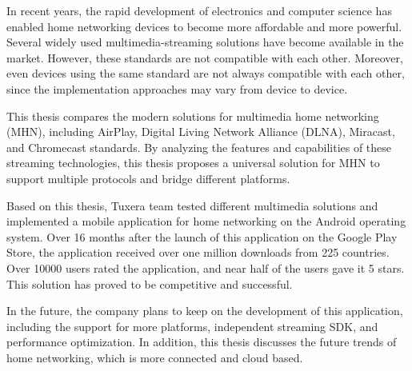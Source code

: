 In recent years, the rapid development of electronics and computer science has
enabled home networking devices to become more affordable and more powerful.
Several widely used multimedia-streaming solutions have become available in the
market. However, these standards are not compatible with each other. Moreover,
even devices using the same standard are not always compatible with each other,
since the implementation approaches may vary from device to device.

This thesis compares the modern solutions for multimedia home networking (MHN),
including AirPlay, Digital Living Network Alliance (DLNA), Miracast, and
Chromecast standards. By analyzing the features and capabilities of these
streaming technologies, this thesis proposes a universal solution for MHN to
support multiple protocols and bridge different platforms.

Based on this thesis, Tuxera team tested different multimedia solutions and
implemented a mobile application for home networking on the Android operating
system. Over 16 months after the launch of this application on the Google Play
Store, the application received over one million downloads from 225 countries.
Over 10000 users rated the application, and near half of the users gave it 5
stars. This solution has proved to be competitive and successful.

In the future, the company plans to keep on the development of this application,
including the support for more platforms, independent streaming SDK, and
performance optimization. In addition, this thesis discusses the future trends
of home networking, which is more connected and cloud based.
